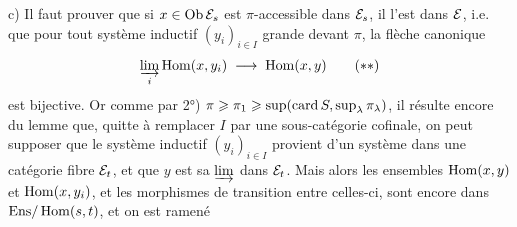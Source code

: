 c) Il faut prouver que si $x \in \operatorname{Ob}\mathcal{E}_s$ est $\pi$-accessible dans $\mathcal{E}_s$, il l'est dans $\mathcal{E}$, i.e. que pour tout système inductif $(y_i)_{i\in I}$ grande devant $\pi$, la flèche canonique
\[
\varinjlim_{i} \operatorname{Hom}(x,y_i) \;\longrightarrow\; \operatorname{Hom}(x,y) \tag*{$(**)$}
\]
est bijective. Or comme par 2°) $\pi \geqslant \pi_1 \geqslant \sup(\operatorname{card} S, \sup_\lambda \pi_\lambda)$, il résulte encore du lemme %
que, quitte à remplacer $I$ par une sous-catégorie cofinale, on peut supposer que le système inductif $(y_i)_{i\in I}$ provient d'un système dans une catégorie fibre $\mathcal{E}_t$, et que $y$ est sa $\varinjlim$ dans $\mathcal{E}_t$. Mais alors les ensembles $\operatorname{Hom}(x,y)$ et $\operatorname{Hom}(x,y_i)$, et les morphismes de transition entre celles-ci, sont encore dans $\mathrm{Ens}/\operatorname{Hom}(s,t)$, et on est ramené
